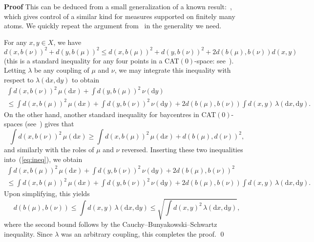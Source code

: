 \documentclass{amsart}
\theoremstyle{remark}
\renewcommand{\d}{\mathrm{d}}
\renewcommand{\l}{\lambda}
\begin{document}
%

\textbf{Proof}\quad 
This can be deduced from a small generalization of a known result:~\cite[Lemma 4.2]{LanPavSch00}, which gives control of a similar kind for measures supported on finitely many atoms.  We quickly repeat the argument from~\cite{LanPavSch00} in the generality we need.

For any $x,y \in X$, we have
\[d(x,b(\nu))^2 + d(y,b(\mu))^2 \leq d(x,b(\mu))^2 + d(y,b(\nu))^2 + 2d(b(\mu),b(\nu))d(x,y)\]
(this is a standard inequality for any four points in a CAT$(0)$-space: see~\cite[Lemma 2.1]{LanPavSch00}). Letting $\l$ be any coupling of $\mu$ and $\nu$, we may integrate this inequality with respect to $\l(\d x,\d y)$ to obtain
\begin{multline}\label{eq:ineq}
\int d(x,b(\nu))^2\,\mu(\d x) + \int d(y,b(\mu))^2\,\nu(\d y)\\
\leq \int d(x,b(\mu))^2\,\mu(\d x) + \int d(y,b(\nu))^2\,\nu(\d y) + 2d(b(\mu),b(\nu))\int d(x,y)\,\l(\d x,\d y).
\end{multline}
On the other hand, another standard inequality for baycentres in CAT$(0)$-spaces (see~\cite[Lemma 4.1]{LanPavSch00}) gives that
\[\int d(x,b(\nu))^2\,\mu(\d x) \geq \int d(x,b(\mu))^2\,\mu(\d x) + d(b(\mu),d(\nu))^2,\]
and similarly with the roles of $\mu$ and $\nu$ reversed.  Inserting these two inequalities into~(\ref{eq:ineq}), we obtain
\begin{multline*}%
\int d(x,b(\mu))^2\,\mu(\d x) + \int d(y,b(\nu))^2\,\nu(\d y) + 2d(b(\mu),b(\nu))^2\\
\leq \int d(x,b(\mu))^2\,\mu(\d x) + \int d(y,b(\nu))^2\,\nu(\d y) + 2d(b(\mu),b(\nu))\int d(x,y)\,\l(\d x,\d y).
\end{multline*}
Upon simplifying, this yields
\[d(b(\mu),b(\nu)) \leq \int d(x,y)\,\l(\d x,\d y) \leq \sqrt{\int d(x,y)^2\,\l(\d x,\d y)},\]
where the second bound follows by the Cauchy--Bunyakowski--Schwartz inequality.  Since $\l$ was an arbitrary coupling, this completes the proof. \qed
\end{document}
